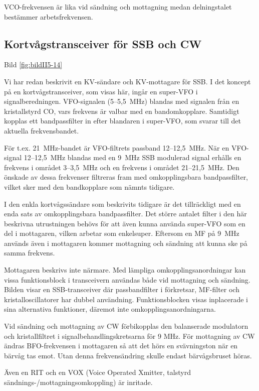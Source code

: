 VCO-frekvensen är lika vid sändning och mottagning medan delningstalet
bestämmer arbetsfrekvensen.

\subsection{Kortvågstransceiver för SSB och CW}

Bild \ref{fig:bildII5-14}

Vi har redan beskrivit en KV-sändare och KV-mottagare för SSB. I det
koncept på en kortvågstransceiver, som visas här, ingår en super-VFO i
signalberedningen. VFO-signalen (5--5,5~MHz) blandas med signalen
från en kristallstyrd CO, vars frekvens är valbar med en
bandomkopplare. Samtidigt kopplas ett bandpassfilter in efter
blandaren i super-VFO, som svarar till det aktuella frekvensbandet.

För t.ex. 21~MHz-bandet är VFO-filtrets passband 12--12,5~MHz. När en
VFO-signal 12--12,5~MHz blandas med en 9~MHz SSB modulerad signal
erhålls en frekvens i området 3--3,5~MHz och en frekvens i området
21--21,5~MHz. Den önskade av dessa frekvenser filtreras fram med
omkopplingsbara bandpassfilter, vilket sker med den bandkopplare som
nämnts tidigare.

I den enkla kortvågssändare som beskrivits tidigare är det
tillräckligt med en enda sats av omkopplingsbara bandpassfilter. Det
större antalet filter i den här beskrivna utrustningen behövs för att
även kunna använda super-VFO som en del i mottagaren, vilken arbetar
som enkelsuper. Eftersom en MF på 9~MHz används även i mottagaren
kommer mottagning och sändning att kunna ske på samma frekvens.

Mottagaren beskrivs inte närmare. Med lämpliga omkopplingsanordningar
kan vissa funktionsblock i transceivern användas både vid mottagning
och sändning. Bilden visar en SSB-transceiver där passbandfilter i
förkretsar, MF-filter och kristalloscillatorer har dubbel
användning. Funktionsblocken visas inplacerade i sina alternativa
funktioner, däremot inte omkopplingsanordningarna.

Vid sändning och mottagning av CW förbikopplas den balanserade
modulatorn och kristallfiltret i signalbehandlingskretsarna för 9
MHz. För mottagning av CW ändras BFO-frekvensen i mottagaren så att
det hörs en svävningston när en bärvåg tas emot. Utan denna
frekvensändring skulle endast bärvågsbruset höras.

Även en RIT och en VOX (Voice Operated Xmitter, talstyrd
sändnings-/mottagningsomkoppling) är inritade.

